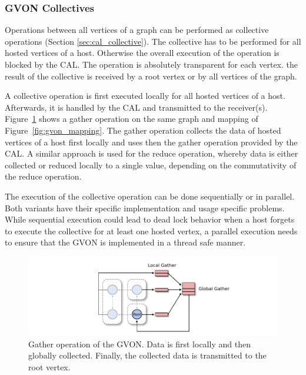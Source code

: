 \subsubsection*{GVON Collectives}
Operations between all vertices of a graph can be performed as
collective operations (Section \ref{sec:cal_collective}).  The
collective has to be performed for all hosted vertices of a
host. Otherwise the overall execution of the operation is blocked by
the CAL. The operation is absolutely transparent for each vertex.  the
result of the collective is received by a root vertex or by all
vertices of the graph.

A collective operation is first executed locally for all hosted
vertices of a host. Afterwards, it is handled by the CAL and
transmitted to the receiver(s). Figure~\ref{fig:gvon_collective} shows
a gather operation on the same graph and mapping of
Figure~\ref{fig:gvon_mapping}. The gather operation collects the data
of hosted vertices of a host first locally and uses then the gather
operation provided by the CAL. A similar approach is used for the
reduce operation, whereby data is either collected or reduced locally
to a single value, depending on the commutativity of the reduce
operation.

The execution of the collective operation can be done sequentially or in
parallel. Both variants have their specific implementation and usage
specific problems. While sequential execution could lead to dead lock behavior
when a host forgets to execute the collective for at least one hosted vertex,
a parallel execution needs to ensure that the GVON is implemented in
a thread safe manner.

\begin{figure}[H]
  \centering \includegraphics[width=\textwidth]{graphics/30_gvon_collective}
  \caption{Gather operation of the GVON. Data is first locally 
    and then globally collected. Finally, the collected data
    is transmitted to the root vertex.}
  \label{fig:gvon_collective}
\end{figure}


